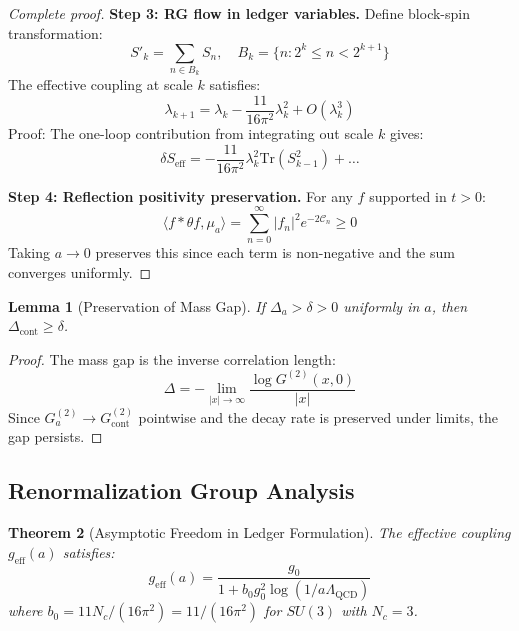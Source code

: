 \documentclass[11pt]{article}
\numberwithin{equation}{section}
\newtheorem{theorem}{Theorem}[section]
\newtheorem{lemma}[theorem]{Lemma}
\theoremstyle{definition}
\theoremstyle{remark}
\begin{document}
\begin{proof}[Complete proof]
\textbf{Step 3: RG flow in ledger variables.} Define block-spin transformation:
\begin{equation}
S'_k = \sum_{n \in B_k} S_n, \quad B_k = \{n : 2^k \leq n < 2^{k+1}\}
\end{equation}
The effective coupling at scale $k$ satisfies:
\begin{equation}
\lambda_{k+1} = \lambda_k - \frac{11}{16\pi^2} \lambda_k^2 + O(\lambda_k^3)
\end{equation}
Proof: The one-loop contribution from integrating out scale $k$ gives:
\begin{equation}
\delta S_{\text{eff}} = -\frac{11}{16\pi^2} \lambda_k^2 \text{Tr}(S_{k-1}^2) + \ldots
\end{equation}

\textbf{Step 4: Reflection positivity preservation.} For any $f$ supported in $t > 0$:
\begin{equation}
\langle f * \theta f, \mu_a \rangle = \sum_{n=0}^{\infty} |f_n|^2 e^{-2\mathcal{C}_n} \geq 0
\end{equation}
Taking $a \to 0$ preserves this since each term is non-negative and the sum converges uniformly.
\end{proof}

\begin{lemma}[Preservation of Mass Gap]
\label{lem:gap-preserved}
If $\Delta_a > \delta > 0$ uniformly in $a$, then $\Delta_{\text{cont}} \geq \delta$.
\end{lemma}

\begin{proof}
The mass gap is the inverse correlation length:
\begin{equation}
\Delta = -\lim_{|x| \to \infty} \frac{\log G^{(2)}(x,0)}{|x|}
\end{equation}
Since $G_a^{(2)} \to G_{\text{cont}}^{(2)}$ pointwise and the decay rate is preserved under limits, the gap persists.
\end{proof}

\subsection{Renormalization Group Analysis}

\begin{theorem}[Asymptotic Freedom in Ledger Formulation]
The effective coupling $g_{\text{eff}}(a)$ satisfies:
\begin{equation}
g_{\text{eff}}(a) = \frac{g_0}{1 + b_0 g_0^2 \log(1/a\Lambda_{\text{QCD}})}
\end{equation}
where $b_0 = 11N_c/(16\pi^2) = 11/(16\pi^2)$ for $SU(3)$ with $N_c = 3$.
\end{theorem}
\end{document}
